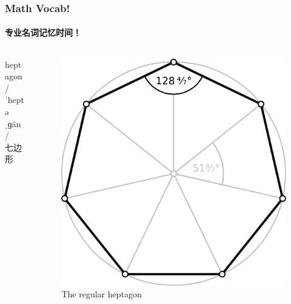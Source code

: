 \documentclass[
	11pt, %
]{beamer}
\begin{document}



\begin{frame}
	\frametitle{Math Vocab!} %
	\framesubtitle{专业名词记忆时间！}
	
	\begin{columns}[t] 
	\begin{column}{0.4\textwidth} %
		{\Huge heptagon}\\
		{\LARGE /ˈheptəˌɡän/\\
			\bigskip\bigskip
		七边形}
	\end{column}
	\begin{column}{0.6\textwidth} %
		\begin{figure}
			\includegraphics[width=0.8\linewidth]{heptagon.png}
			\caption{The regular heptagon}
		\end{figure}	
	\end{column}
\end{columns}
\end{frame}

\end{document}
